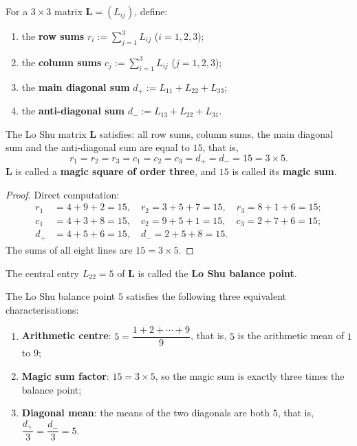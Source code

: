 \begin{definition}\label{def:luoshu_line_sums}
For a $3 \times 3$ matrix $\mathbf{L} = (L_{ij})$, define:
\begin{enumerate}[label=(\roman*)]
    \item the \textbf{row sums} $r_i := \sum_{j=1}^{3} L_{ij}$ ($i = 1, 2, 3$);
    \item the \textbf{column sums} $c_j := \sum_{i=1}^{3} L_{ij}$ ($j = 1, 2, 3$);
    \item the \textbf{main diagonal sum} $d_+ := L_{11} + L_{22} + L_{33}$;
    \item the \textbf{anti-diagonal sum} $d_- := L_{13} + L_{22} + L_{31}$.
\end{enumerate}
\end{definition}

\begin{proposition}\label{prop:luoshu_magic_sum}
The Lo Shu matrix $\mathbf{L}$ satisfies: all row sums, column sums, the main diagonal sum and the anti-diagonal sum are equal to $15$, that is,
\[
r_1 = r_2 = r_3 = c_1 = c_2 = c_3 = d_+ = d_- = 15 = 3 \times 5.
\]
$\mathbf{L}$ is called a \textbf{magic square of order three}, and $15$ is called its \textbf{magic sum}.
\end{proposition}

\begin{proof}
Direct computation:
\begin{align*}
r_1 &= 4 + 9 + 2 = 15, \quad r_2 = 3 + 5 + 7 = 15, \quad r_3 = 8 + 1 + 6 = 15; \\
c_1 &= 4 + 3 + 8 = 15, \quad c_2 = 9 + 5 + 1 = 15, \quad c_3 = 2 + 7 + 6 = 15; \\
d_+ &= 4 + 5 + 6 = 15, \quad d_- = 2 + 5 + 8 = 15.
\end{align*}
The sums of all eight lines are $15 = 3 \times 5$.
\end{proof}

\begin{definition}\label{def:luoshu_balance_point}
The central entry $L_{22} = 5$ of $\mathbf{L}$ is called the \textbf{Lo Shu balance point}.
\end{definition}

\begin{proposition}\label{prop:luoshu_balance_triple}
The Lo Shu balance point $5$ satisfies the following three equivalent characterisations:
\begin{enumerate}[label=(\roman*)]
    \item \textbf{Arithmetic centre}: $5 = \dfrac{1 + 2 + \cdots + 9}{9}$, that is, $5$ is the arithmetic mean of $1$ to $9$;
    \item \textbf{Magic sum factor}: $15 = 3 \times 5$, so the magic sum is exactly three times the balance point;
    \item \textbf{Diagonal mean}: the means of the two diagonals are both $5$, that is, $\dfrac{d_+}{3} = \dfrac{d_-}{3} = 5$.
\end{enumerate}
\end{proposition}

